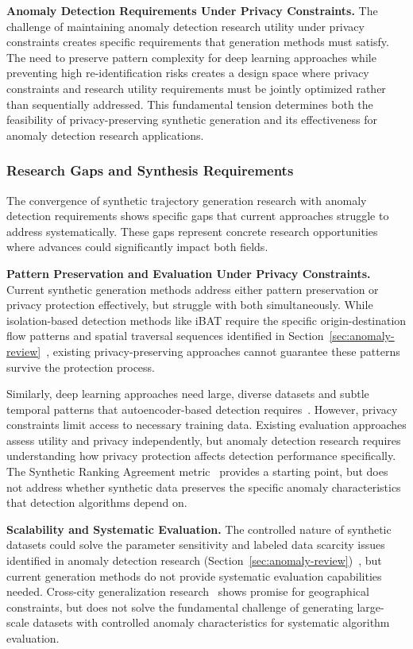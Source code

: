 \textbf{Anomaly Detection Requirements Under Privacy Constraints.} The challenge of maintaining anomaly detection research utility under privacy constraints creates specific requirements that generation methods must satisfy. The need to preserve pattern complexity for deep learning approaches while preventing high re-identification risks creates a design space where privacy constraints and research utility requirements must be jointly optimized rather than sequentially addressed. This fundamental tension determines both the feasibility of privacy-preserving synthetic generation and its effectiveness for anomaly detection research applications.

\subsubsection{Research Gaps and Synthesis Requirements}

The convergence of synthetic trajectory generation research with anomaly detection requirements shows specific gaps that current approaches struggle to address systematically. These gaps represent concrete research opportunities where advances could significantly impact both fields.

\textbf{Pattern Preservation and Evaluation Under Privacy Constraints.} Current synthetic generation methods address either pattern preservation or privacy protection effectively, but struggle with both simultaneously. While isolation-based detection methods like iBAT require the specific origin-destination flow patterns and spatial traversal sequences identified in Section~\ref{sec:anomaly-review}~\cite{zhangIBATDetectingAnomalous2011}, existing privacy-preserving approaches cannot guarantee these patterns survive the protection process.

Similarly, deep learning approaches need large, diverse datasets and subtle temporal patterns that autoencoder-based detection requires~\cite{huangLSTMAutoencodersAttention2021}. However, privacy constraints limit access to necessary training data. Existing evaluation approaches assess utility and privacy independently, but anomaly detection research requires understanding how privacy protection affects detection performance specifically. The Synthetic Ranking Agreement metric~\cite{jordonPATEGANGeneratingSynthetic2019} provides a starting point, but does not address whether synthetic data preserves the specific anomaly characteristics that detection algorithms depend on.

\textbf{Scalability and Systematic Evaluation.} The controlled nature of synthetic datasets could solve the parameter sensitivity and labeled data scarcity issues identified in anomaly detection research (Section~\ref{sec:anomaly-review})~\cite{zhangIBATDetectingAnomalous2011}, but current generation methods do not provide systematic evaluation capabilities needed. Cross-city generalization research~\cite{wangGTGGeneralizableTrajectory2025} shows promise for geographical constraints, but does not solve the fundamental challenge of generating large-scale datasets with controlled anomaly characteristics for systematic algorithm evaluation.

